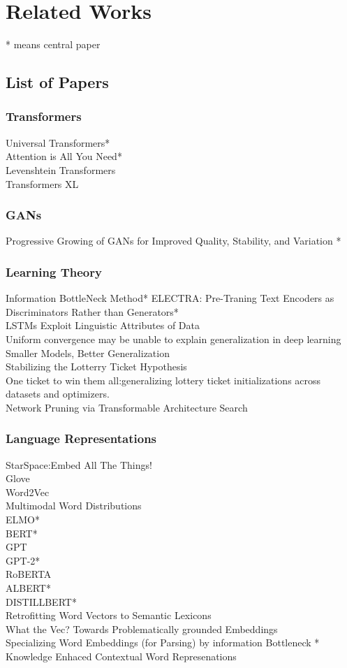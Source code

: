 \documentclass [11pt, proquest] {uwthesis}[2020/08/20]
\begin{document}
\chapter{Related Works}
* means central paper
\section{List of Papers}
\subsection{Transformers}
Universal Transformers* \\
Attention is All You Need* \\
Levenshtein Transformers \\
Transformers XL \\ 
\subsection{GANs}
Progressive Growing of GANs for Improved Quality, Stability, and Variation *
\subsection{Learning Theory}
Information BottleNeck Method*
ELECTRA: Pre-Traning Text Encoders as Discriminators Rather than Generators*\\
LSTMs Exploit Linguistic Attributes of Data\\
Uniform convergence may be unable to explain generalization in deep learning \\
Smaller Models, Better Generalization \\ 
Stabilizing the Lotterry Ticket Hypothesis \\
One ticket to win them all:generalizing lottery ticket initializations across datasets and optimizers. \\ 
Network Pruning via Transformable Architecture Search

\subsection{Language Representations}
StarSpace:Embed All The Things!\\
Glove \\
Word2Vec \\
Multimodal Word Distributions\\
ELMO*\\
BERT* \\
GPT\\
GPT-2*\\
RoBERTA \\
ALBERT*\\
DISTILLBERT*\\
Retrofitting Word Vectors to Semantic Lexicons \\
What the Vec? Towards Problematically grounded Embeddings \\
Specializing Word Embeddings (for Parsing) by information Bottleneck *\\
Knowledge Enhaced Contextual Word Represenations
\end{document}
